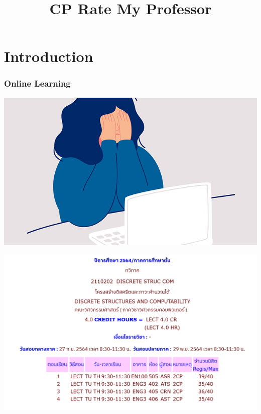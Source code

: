 \documentclass[aspectratio=169]{beamer}
\title{CP Rate My Professor}
\begin{document}
\section{Introduction}
\frame{\titlepage}
\begin{frame}
    \frametitle{Online Learning}
    \centering
    \includegraphics[scale=0.5]{online_learning.jpg}
\end{frame}
\begin{frame}
    \centering
    \includegraphics[scale=0.4]{discrete_section.png}
\end{frame}
\end{document}
